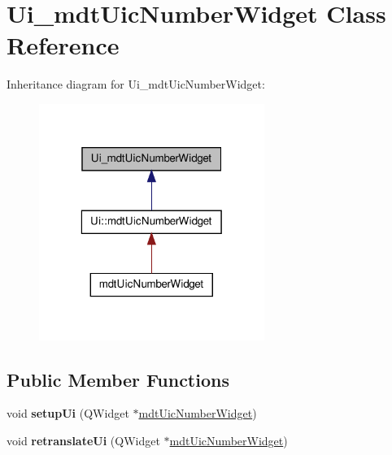 \hypertarget{class_ui__mdt_uic_number_widget}{
\section{Ui\_\-mdtUicNumberWidget Class Reference}
\label{class_ui__mdt_uic_number_widget}
}


Inheritance diagram for Ui\_\-mdtUicNumberWidget:\nopagebreak
\begin{figure}[H]
\begin{center}
\leavevmode
\includegraphics[width=208pt]{class_ui__mdt_uic_number_widget__inherit__graph}
\end{center}
\end{figure}
\subsection*{Public Member Functions}
\begin{DoxyCompactItemize}
\item 
\hypertarget{class_ui__mdt_uic_number_widget_a5bcf4bc93d6fb43df9c27415267b9861}{
void {\bfseries setupUi} (QWidget $\ast$\hyperlink{classmdt_uic_number_widget}{mdtUicNumberWidget})}
\label{class_ui__mdt_uic_number_widget_a5bcf4bc93d6fb43df9c27415267b9861}

\item 
\hypertarget{class_ui__mdt_uic_number_widget_a6b54290c2309a71e43004ccf22a7796a}{
void {\bfseries retranslateUi} (QWidget $\ast$\hyperlink{classmdt_uic_number_widget}{mdtUicNumberWidget})}
\label{class_ui__mdt_uic_number_widget_a6b54290c2309a71e43004ccf22a7796a}

\end{DoxyCompactItemize}
